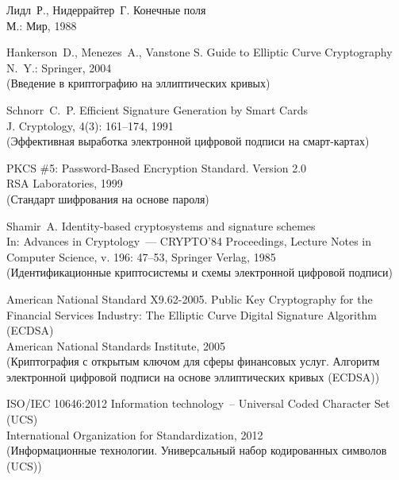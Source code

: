 \clearpage
\begin{thebibliography}{9}
\renewcommand{\bibname}{Библиография}

Лидл~Р., Нидеррайтер~Г. Конечные поля\\
{\small М.: Мир, 1988}

Hankerson~D., Menezes~A., Vanstone S.
Guide to Elliptic Curve Cryptography\\
{\small N.~Y.: Springer, 2004}\\
{\small (Введение в криптографию на эллиптических кривых)}

Schnorr~C.~P.
Efficient Signature Generation by Smart Cards\\
{\small J. Cryptology, 4(3): 161--174, 1991}\\
{\small (Эффективная выработка электронной цифровой подписи на смарт-картах)}

PKCS \#5: Password-Based Encryption Standard. Version 2.0\\
{\small RSA Laboratories, 1999}\\
{\small (Стандарт шифрования на основе пароля)}

Shamir~A. 
Identity-based cryptosystems and signature schemes\\
{\small In: Advances in Cryptology~--– CRYPTO’84 Proceedings, 
Lecture Notes in Computer Science, v. 196: 47–53, 
Springer Verlag, 1985}\\
{\small 
(Идентификационные криптосистемы и схемы электронной цифровой подписи)}

American National Standard X9.62-2005.
Public Key Cryptography for the Financial Services Industry: 
The Elliptic Curve Digital Signature Algorithm (ECDSA)\\
{\small American National Standards Institute, 2005}\\
{\small (Криптография с открытым ключом для сферы финансовых услуг. 
Алгоритм электронной цифровой подписи на основе эллиптических кривых 
(ECDSA))} 

ISO/IEC 10646:2012
Information technology~-- Universal Coded Character Set (UCS)\\
{\small International Organization for Standardization, 2012}\\
{\small (Информационные технологии. 
Универсальный набор кодированных символов (UCS))}

\label{LastBib}
\end{thebibliography}

